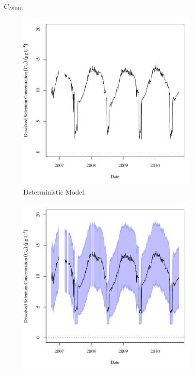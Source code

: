 \subfiguretop
\begin{landscape}
	\begin{figure}
		$ C_{D101C} $
		\begin{subfigure}{0.7\textwidth}
			\centering
			\includegraphics[width=\tableCustomSize]{"Figures/Results_DSR/Deterministic/c TS D101C"}
			\caption{Deterministic Model.}
		\end{subfigure}%
		\begin{subfigure}{0.7\textwidth}
			\centering
			\includegraphics[width=\tableCustomSize]{"Figures/Results_DSR/Stochastic/c TS D101C"}

\end{subfigure}
\end{figure}
\end{landscape}

